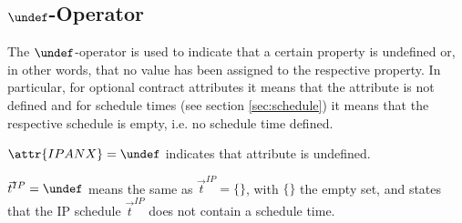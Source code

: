 \subsection{$\undef$-Operator}\label{sec:undef}

The $\undef$-operator is used to indicate that a certain property is undefined or, in other words, that no value has been assigned to the respective property. In particular, for optional contract attributes it means that the attribute is not defined and for schedule times (see section \ref{sec:schedule}) it means that the respective schedule is empty, i.e. no schedule time defined.

\begin{example}
$\attr{IPANX}=\undef$ indicates that attribute  is undefined.
\end{example}

\begin{example}
$\vec{t}^{IP}=\undef$ means the same as $\vec{t}^{IP}=\{\}$, with $\{\}$ the empty set, and states that the IP schedule $\vec{t}^{IP}$ does not contain a schedule time.
\end{example}

